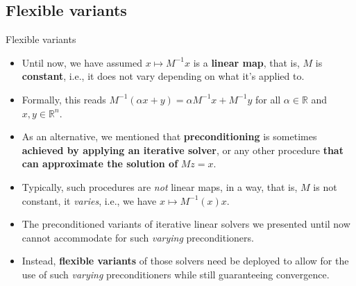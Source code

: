 \documentclass[t,usepdftitle=false]{beamer}
\begin{document}
\subsection{Flexible variants}
\begin{frame}{Flexible variants}
\begin{itemize}
\item Until now, we have assumed $x\mapsto M^{-1}x$ is a \textbf{linear map}, that is, $M$ is \textbf{constant}, i.e., it does not vary depending on what it's applied to.
\item[] Formally, this reads $M^{-1}(\alpha x+y)=\alpha M^{-1} x+M^{-1}y$ for all $\alpha\in\mathbb{R}$ and $x,y\in\mathbb{R}^n$.
\item As an alternative, we mentioned that \textbf{preconditioning} is sometimes \textbf{achieved by applying an iterative solver}, or any other procedure \textbf{that can approximate the solution of} $Mz=x$.
\item[] Typically, such procedures are \textit{not} linear maps, in a way, that is, $M$ is not constant, it \textit{varies}, i.e., we have $x\mapsto M^{-1}(x)x$.
\item The preconditioned variants of iterative linear solvers we presented until now cannot accommodate for such \textit{varying} preconditioners.
\item[] Instead, \textbf{flexible variants} of those solvers need be deployed to allow for the use of such \textit{varying} preconditioners while still guaranteeing convergence.
\end{itemize}
\end{frame}
\end{document}
